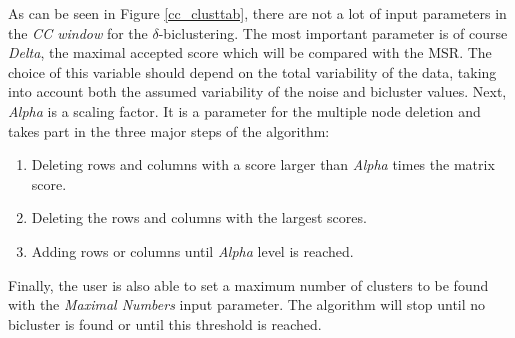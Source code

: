 \documentclass[a4paper]{article}\usepackage[]{graphicx}\usepackage[]{color}
\begin{document}
\noindent As can be seen in Figure \ref{cc_clusttab}, there are not a lot of
input parameters in the {\it CC window} for the $\delta$-biclustering. The most
important parameter is of course {\it Delta}, the maximal accepted score which
will be compared with the MSR. The choice of this variable should depend
on the total variability of the data, taking into account both the assumed
variability of the noise and bicluster values. Next, {\it Alpha} is a scaling
factor. It is a parameter for the multiple node deletion and takes part in the
three major steps of the algorithm:
\begin{enumerate}
  \item Deleting rows and columns with a score larger than {\it Alpha} times the
 matrix score.
 \item Deleting the rows and columns with the largest scores.
 \item Adding rows or columns until {\it Alpha} level is reached.
\end{enumerate}
\noindent Finally, the user is also able to set a maximum number of clusters to
be found with the {\it Maximal Numbers} input parameter. The algorithm will stop
until no bicluster is found or until this threshold is reached.
\end{document}
